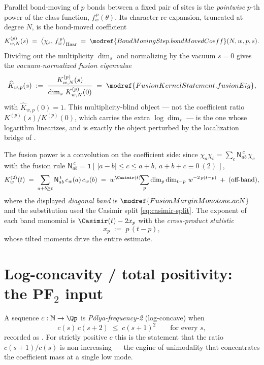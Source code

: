 \begin{definition}
\label{def:core-b-fusion}
Parallel bond-moving of $p$ bonds between a fixed pair of sites is the
\emph{pointwise} $p$-th power of the class function, $f_w^{\,p}(\theta)$.  Its
character re-expansion, truncated at degree $N$, is the bond-moved coefficient
\[
  K^{(p)}_{w,N}(s)
    \;=\; \bigl\langle \chi_s,\, f_w^{\,p}\bigr\rangle_{\mathrm{Haar}}
    \;=\; \modref{BondMovingStep.bondMovedCoeff}(N,w,p,s).
\]
Dividing out the multiplicity $\dim_s$ and normalizing by the vacuum $s=0$ gives the
\emph{vacuum-normalized fusion eigenvalue}
\[
  \widehat K_{w,p}(s)
    \;:=\; \frac{K^{(p)}_{w,N}(s)}{\dim_s\, K^{(p)}_{w,N}(0)}
    \;=\; \modref{FusionKernelStatement.fusionEig},
\]
with $\widehat K_{w,p}(0)=1$.  This multiplicity-blind object — not the coefficient
ratio $K^{(p)}(s)/K^{(p)}(0)$, which carries the extra $\log\dim_s$ — is the one
whose logarithm linearizes, and is exactly the object perturbed by the localization
bridge of .
\end{definition}

The fusion power is a convolution on the coefficient side: since
$\chi_a\chi_b = \sum_c \mathsf N_{ab}^{\,c}\,\chi_c$ with the \SUtwo{} fusion rule
$\mathsf N_{ab}^{\,c} = \mathbf 1[\,|a-b|\le c\le a+b,\ a+b+c\equiv 0\ (2)\,]$,
\[
  K^{(2)}_{w}(t)
    \;=\; \sum_{a+b\ge t}\mathsf N_{ab}^{\,t}\,c_w(a)\,c_w(b)
    \;=\; w^{\Casimir(t)}\!\!\sum_{p}\dim_p\dim_{t-p}\,w^{-2\,p(t-p)}
    \;+\;(\text{off-band}),
\]
where the displayed \emph{diagonal band} is $\modref{FusionMarginMonotone.acN}$ and
the substitution used the Casimir split \eqref{eq:casimir-split}.  The exponent of
each band monomial is $\Casimir(t)-2x_p$ with the \emph{cross-product statistic}
\[
  x_p \;:=\; p\,(t-p),
\]
whose tilted moments drive the entire estimate.

\section{Log-concavity / total positivity: the PF\texorpdfstring{$_2$}{2} input}
\label{sec:core-b-pf2}

\begin{definition}
A sequence $c:\mathbb N\to\Qp$ is \emph{Pólya-frequency-2} (log-concave) when
\[
  c(s)\,c(s+2) \;\le\; c(s+1)^{2}\qquad\text{for every }s,
\]
recorded as .  For strictly positive $c$ this is
the statement that the ratio $c(s+1)/c(s)$ is non-increasing — the engine of
unimodality that concentrates the coefficient mass at a single low mode.
\end{definition}

